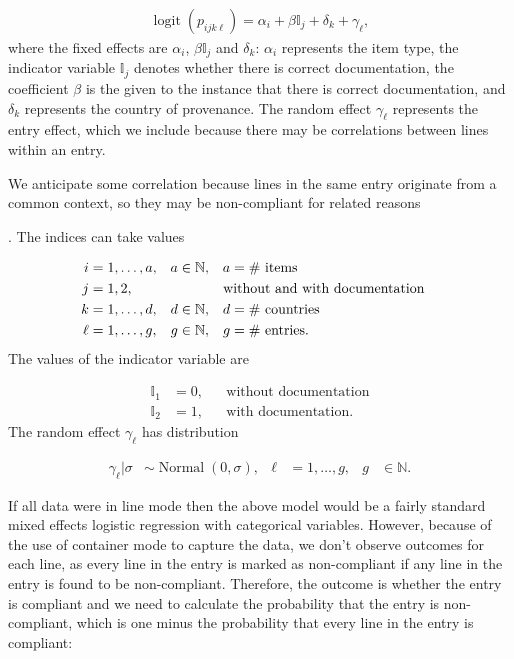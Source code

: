 \documentclass[useAMS,usenatbib,referee]{biom}
\newif\ifproofread
\newcommand{\rev}[1]{%
\ifproofread
\hl{#1}%
\else
#1%
\fi
}
\DeclareMathOperator{\logit}{logit}
\DeclareMathOperator{\Normal}{Normal}
\begin{document}
\begin{align}
\logit(p_{ijk\ell}) = \alpha_{i} + \beta\mathbb{I}_j + \delta_k + \gamma_\ell \label{eq:logit_model_sim},
\end{align}
where the fixed effects are $\alpha_i$, $\beta\mathbb{I}_j$ and $\delta_k$: $\alpha_i$ represents the item type, the indicator variable $\mathbb{I}_j$ denotes whether there is correct documentation, the coefficient $\beta$ is the given to the instance that there is correct documentation, and $\delta_k$ represents the country of provenance. The random effect $\gamma_\ell$ represents the entry effect, which we include because there may be correlations between lines within an entry. \rev{We anticipate some correlation because lines in the same entry originate from a common context, so they may be non-compliant for related reasons}. The indices can take values

\begin{align}
i &=1, \ldots, a, & a&\in \mathbb{N},& a &= \text{\# items}\\
j &= 1, 2, & & & &\text{\hspace{-5pt}without and with documentation}&\\
k &= 1,\ldots, d,& d &\in \mathbb{N},& d &= \text{\# countries}\\
\ell &= 1,\ldots,g,& g&\in \mathbb{N},& g &= \text{\# entries}.
\end{align}
The values of the indicator variable are

\begin{align}
\mathbb{I}_1 & = 0,& &\text{without documentation}\\
\mathbb{I}_2 &= 1,& &\text{with documentation}.
\end{align}
The random effect $\gamma_\ell$ has distribution

\begin{align}
\gamma_\ell | \sigma &\sim \Normal(0, \sigma), & \ell &= 1,\ldots, g, & g&\in \mathbb{N}.
\label{eq:entry_effect}
\end{align}

If all data were in line mode then the above model would be a fairly standard mixed effects logistic regression with categorical variables. However, because of the use of container mode to capture the data, we don't observe outcomes for each line, as every line in the entry is marked as non-compliant if any line in the entry is found to be non-compliant. Therefore, the outcome is whether the entry is compliant and we need to calculate the probability that the entry is non-compliant, which is one minus the probability that every line in the entry is compliant:
\end{document}
